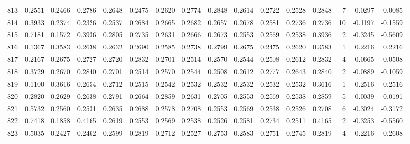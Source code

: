 \begin{tabular}{lrrrrrrrrrrrrrrr}
813 &      0.2551 &  0.2466 &  0.2786 &  0.2648 &  0.2475 &  0.2620 &  0.2774 &  0.2848 &  0.2614 &  0.2722 &   0.2528 &     0.2848 &      7 &                    0.0297 &                    -0.0085 \\
814 &      0.3933 &  0.2374 &  0.2326 &  0.2537 &  0.2684 &  0.2665 &  0.2682 &  0.2657 &  0.2678 &  0.2581 &   0.2736 &     0.2736 &     10 &                   -0.1197 &                    -0.1559 \\
815 &      0.7181 &  0.1572 &  0.3936 &  0.2805 &  0.2735 &  0.2631 &  0.2666 &  0.2673 &  0.2553 &  0.2569 &   0.2538 &     0.3936 &      2 &                   -0.3245 &                    -0.5609 \\
816 &      0.1367 &  0.3583 &  0.2638 &  0.2632 &  0.2690 &  0.2585 &  0.2738 &  0.2799 &  0.2675 &  0.2475 &   0.2620 &     0.3583 &      1 &                    0.2216 &                     0.2216 \\
817 &      0.2167 &  0.2675 &  0.2727 &  0.2720 &  0.2832 &  0.2701 &  0.2514 &  0.2570 &  0.2544 &  0.2508 &   0.2612 &     0.2832 &      4 &                    0.0665 &                     0.0508 \\
818 &      0.3729 &  0.2670 &  0.2840 &  0.2701 &  0.2514 &  0.2570 &  0.2544 &  0.2508 &  0.2612 &  0.2777 &   0.2643 &     0.2840 &      2 &                   -0.0889 &                    -0.1059 \\
819 &      0.1100 &  0.3616 &  0.2654 &  0.2712 &  0.2515 &  0.2542 &  0.2532 &  0.2532 &  0.2532 &  0.2532 &   0.2532 &     0.3616 &      1 &                    0.2516 &                     0.2516 \\
820 &      0.2820 &  0.2629 &  0.2638 &  0.2791 &  0.2664 &  0.2859 &  0.2631 &  0.2705 &  0.2553 &  0.2569 &   0.2538 &     0.2859 &      5 &                    0.0039 &                    -0.0191 \\
821 &      0.5732 &  0.2560 &  0.2531 &  0.2635 &  0.2688 &  0.2578 &  0.2708 &  0.2553 &  0.2569 &  0.2538 &   0.2526 &     0.2708 &      6 &                   -0.3024 &                    -0.3172 \\
822 &      0.7418 &  0.1858 &  0.4165 &  0.2619 &  0.2553 &  0.2569 &  0.2538 &  0.2526 &  0.2581 &  0.2734 &   0.2511 &     0.4165 &      2 &                   -0.3253 &                    -0.5560 \\
823 &      0.5035 &  0.2427 &  0.2462 &  0.2599 &  0.2819 &  0.2712 &  0.2527 &  0.2753 &  0.2583 &  0.2751 &   0.2745 &     0.2819 &      4 &                   -0.2216 &                    -0.2608 \\

\end{tabular}
